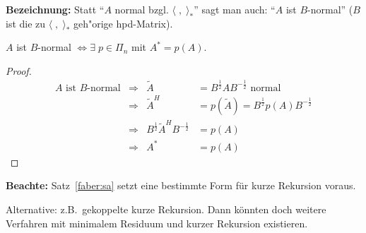 \textbf{Bezeichnung:} Statt "`$A$ normal bzgl. $\langle \; , \; \rangle_*$"' sagt man auch: "`$A$ ist $B$-normal"' ($B$ ist die zu
$\langle \; , \; \rangle_*$ geh"orige hpd-Matrix).
%
\begin{cor}
 $A$ ist $B$-normal $\Longleftrightarrow \exists \; p \in \Pi_n$ mit $A^*=p(A)$.
\end{cor}
\begin{proof}
 \begin{align*}
 A \text{ ist $B$-normal} & \Longrightarrow    & \tilde{A}    &= B^{\frac{1}{2}}AB^{-\frac{1}{2}} \text{ normal} \\
 & \Longrightarrow        & \tilde{A}^H     &= p(\tilde{A}) = B^{\frac{1}{2}}p(A)B^{-\frac{1}{2}} \\
 & \Longrightarrow        & B^{\frac{1}{2}}\tilde{A}^HB^{-\frac{1}{2}} &=p(A) \\
 & \Longrightarrow        & A^*        & = p(A)
 \end{align*}
\end{proof}
%


\textbf{Beachte:} Satz~\ref{faber:sa} setzt eine bestimmte Form f\"ur kurze
Rekursion voraus.

Alternative: z.B.~gekoppelte kurze Rekursion. Dann k\"onnten doch weitere
Verfahren mit minimalem Residuum und kurzer Rekursion existieren.

